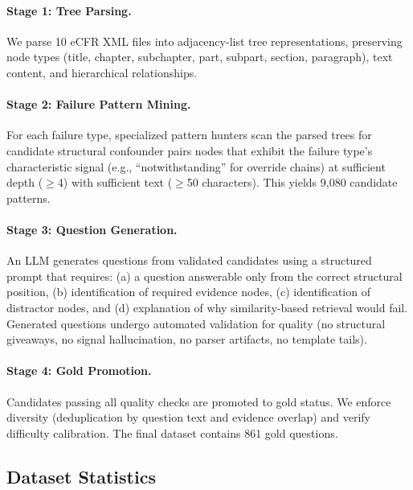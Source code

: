 \documentclass[11pt]{article}
\begin{document}
\paragraph{Stage 1: Tree Parsing.} We parse 10 eCFR XML files into adjacency-list tree representations, preserving node types (title, chapter, subchapter, part, subpart, section, paragraph), text content, and hierarchical relationships.

\paragraph{Stage 2: Failure Pattern Mining.} For each failure type, specialized pattern hunters scan the parsed trees for candidate structural confounder pairs nodes that exhibit the failure type's characteristic signal (e.g., ``notwithstanding'' for override chains) at sufficient depth ($\geq$4) with sufficient text ($\geq$50 characters). This yields 9,080 candidate patterns.

\paragraph{Stage 3: Question Generation.} An LLM generates questions from validated candidates using a structured prompt that requires: (a) a question answerable only from the correct structural position, (b) identification of required evidence nodes, (c) identification of distractor nodes, and (d) explanation of why similarity-based retrieval would fail. Generated questions undergo automated validation for quality (no structural giveaways, no signal hallucination, no parser artifacts, no template tails).

\paragraph{Stage 4: Gold Promotion.} Candidates passing all quality checks are promoted to gold status. We enforce diversity (deduplication by question text and evidence overlap) and verify difficulty calibration. The final dataset contains 861 gold questions.

\subsection{Dataset Statistics}
\end{document}
